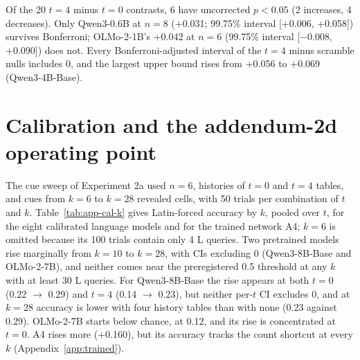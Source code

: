 \documentclass[11pt]{article}
\begin{document}
Of the 20 $t = 4$ minus $t = 0$ contrasts, 6 have uncorrected $p < 0.05$ (2 increases, 4 decreases). Only Qwen3-0.6B at $n = 8$ (+0.031; 99.75\% interval [+0.006, +0.058]) survives Bonferroni; OLMo-2-1B's +0.042 at $n = 6$ (99.75\% interval [$-$0.008, +0.090]) does not. Every Bonferroni-adjusted interval of the $t = 4$ minus scramble nulls includes 0, and the largest upper bound rises from +0.056 to +0.069 (Qwen3-4B-Base).

\section{Calibration and the addendum-2d operating point}\label{app:calib}

The cue sweep of Experiment 2a used $n = 6$, histories of $t = 0$ and $t = 4$ tables, and cues from $k = 6$ to $k = 28$ revealed cells, with 50 trials per combination of $t$ and $k$. Table~\ref{tab:app-cal-k} gives Latin-forced accuracy by $k$, pooled over $t$, for the eight calibrated language models and for the trained network A4; $k = 6$ is omitted because its 100 trials contain only 4 L queries. Two pretrained models rise marginally from $k = 10$ to $k = 28$, with CIs excluding 0 (Qwen3-8B-Base and OLMo-2-7B), and neither comes near the preregistered 0.5 threshold at any $k$ with at least 30 L queries. For Qwen3-8B-Base the rise appears at both $t = 0$ (0.22 $\to$ 0.29) and $t = 4$ (0.14 $\to$ 0.23), but neither per-$t$ CI excludes 0, and at $k = 28$ accuracy is lower with four history tables than with none (0.23 against 0.29). OLMo-2-7B starts below chance, at 0.12, and its rise is concentrated at $t = 0$. A4 rises more (+0.160), but its accuracy tracks the count shortcut at every $k$ (Appendix~\ref{app:trained}).
\end{document}
